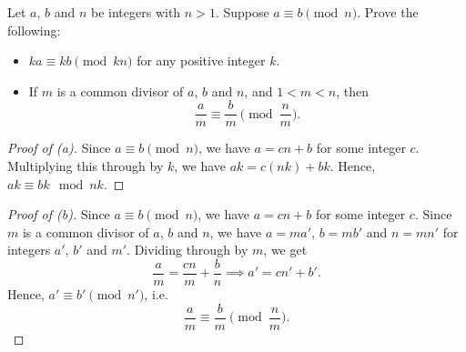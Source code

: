 \begin{problem}
    Let $a$, $b$ and $n$ be integers with $n > 1$. Suppose $a \equiv b \pmod{n}$. Prove the following:
    \begin{itemize}
        \item $ka \equiv kb \pmod{kn}$ for any positive integer $k$.
        \item If $m$ is a common divisor of $a$, $b$ and $n$, and $1 < m < n$, then \[\frac{a}{m} \equiv \frac{b}{m} \pmod{\frac{n}{m}}.\]
    \end{itemize}
\end{problem}
\begin{solution}
    \begin{proof}[Proof of \emph{(a)}]
        Since $a \equiv b \pmod{n}$, we have $a = cn + b$ for some integer $c$. Multiplying this through by $k$, we have $ak = c(nk) + bk$. Hence, $ak \equiv bk \mod{nk}$.
    \end{proof}
    \begin{proof}[Proof of \emph{(b)}]
        Since $a \equiv b \pmod{n}$, we have $a = cn + b$ for some integer $c$. Since $m$ is a common divisor of $a$, $b$ and $n$, we have $a = ma'$, $b = mb'$ and $n = mn'$ for integers $a'$, $b'$ and $m'$. Dividing through by $m$, we get \[\frac{a}{m} = \frac{cn}{m} + \frac{b}{n} \implies a' = c n' + b'.\] Hence, $a' \equiv b' \pmod{n'}$, i.e. \[\frac{a}{m} \equiv \frac{b}{m} \pmod{\frac{n}{m}}.\]
    \end{proof}
\end{solution}